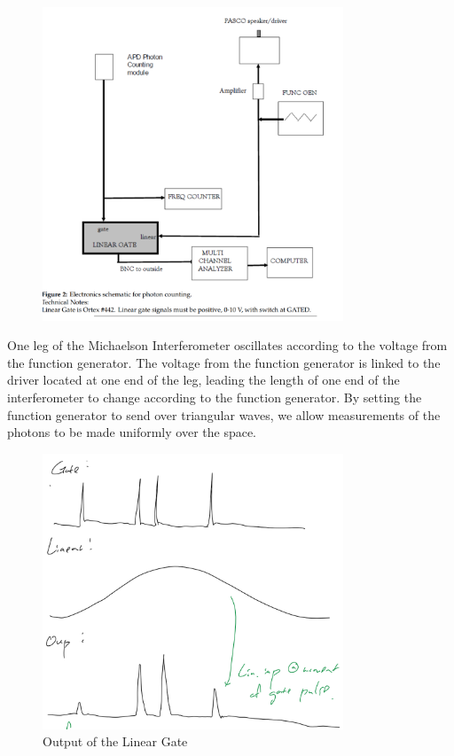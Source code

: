 \documentclass{article}
\numberwithin{equation}{section}
\begin{document}
\begin{figure}[h]
    \centering
    \includegraphics[width=0.8\textwidth]{electronics.png} %
    \label{fig:electronics}
\end{figure}

One leg of the Michaelson Interferometer oscillates according to the 
voltage from the function generator.
The voltage from the function generator is linked to the driver located 
at one end of the leg, leading the length of one end of the interferometer 
to change according to the function generator. 
By setting the function generator 
to send over triangular waves, we allow measurements of the 
photons to be made uniformly over the space. 

\begin{figure}[h]
    \centering
    \includegraphics[width=0.8\textwidth]{lineargate.png} %
    \caption{Output of the Linear Gate}
    \label{fig:lineargate}
\end{figure}
\end{document}
